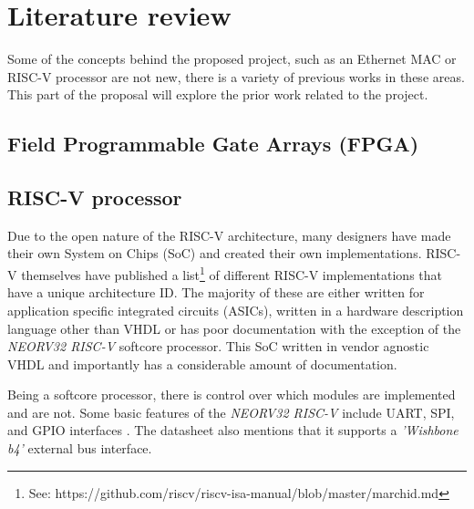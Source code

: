 
\chapter[Literature review]{Literature review }
\label{Chap:label}	%
\pagestyle{headings}



Some of the concepts behind the proposed project, such as an Ethernet MAC or RISC-V processor are not new, there is a variety of previous works in these areas. This part of the proposal will explore the prior work related to the project. 


\section{Field Programmable Gate Arrays (FPGA)}


\section{RISC-V processor}
Due to the open nature of the RISC-V architecture, many designers have made their own System on Chips (SoC) and created their own implementations. RISC-V 
themselves have published a list\footnote[1]{See: https://github.com/riscv/riscv-isa-manual/blob/master/marchid.md} of different RISC-V implementations 
that have a unique architecture ID. The majority of these are either written for application specific integrated circuits (ASICs), written in a hardware 
description language other than VHDL or has poor documentation with the exception of the  \textit{NEORV32 RISC-V} softcore processor. This SoC written 
in vendor agnostic VHDL and importantly has a considerable amount of documentation. 

Being a softcore processor, there is control over which modules are implemented and are not. Some basic features of the \textit{NEORV32 RISC-V} include 
UART, SPI, and GPIO interfaces \cite{neorv32Datasheet}. The datasheet \cite{neorv32Datasheet} also mentions that it supports a \textit{'Wishbone b4'} 
external bus interface. 


